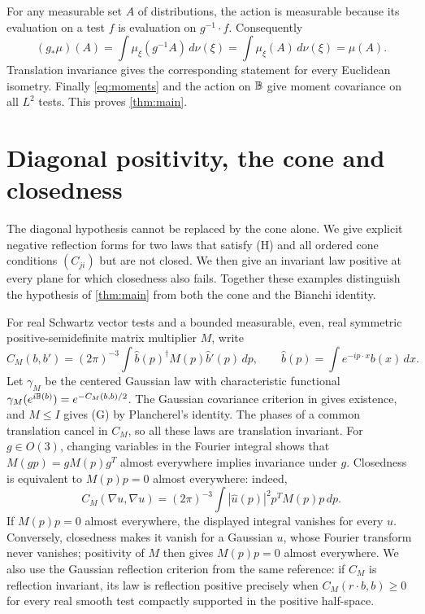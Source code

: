 \documentclass[11pt,letterpaper,reqno]{amsart}
\theoremstyle{definition}
\theoremstyle{remark}
\begin{document}
For any measurable set $A$ of distributions, the action is measurable
because its evaluation on a test $f$ is evaluation on $g^{-1}\cdot f$.
Consequently
\[
 (g_*\mu)(A)=\int\mu_\xi(g^{-1}A)\,d\nu(\xi)
            =\int\mu_\xi(A)\,d\nu(\xi)=\mu(A).
\]
Translation invariance gives the corresponding statement for every
Euclidean isometry. Finally \eqref{eq:moments} and the action on
$\mathbb B$ give moment covariance on all $L^2$ tests. This proves
\cref{thm:main}.

\section{Diagonal positivity, the cone and closedness}\label{sec:examples}

The diagonal hypothesis cannot be replaced by the cone alone. We give
explicit negative reflection forms for two laws that satisfy (H) and
all ordered cone conditions $(C_{ji})$ but are not closed. We then
give an invariant law positive at every plane for which closedness
also fails. Together these examples distinguish the hypothesis of
\cref{thm:main} from both the cone and the Bianchi identity.

For real Schwartz vector tests and a bounded measurable, even, real
symmetric positive-semidefinite matrix multiplier $M$, write
\[
 C_M(b,b')=(2\pi)^{-3}\int\widehat b(p)^\dagger M(p)\widehat b'(p)\,dp,
 \qquad \widehat b(p)=\int e^{-ip\cdot x}b(x)\,dx.
\]
Let $\gamma_M$ be the centered Gaussian law with characteristic
functional $\gamma_M(e^{i\mathbb B(b)})=e^{-C_M(b,b)/2}$.
The Gaussian covariance criterion in
\cite[Appendix~D, ``Gaussian laws and reflection positivity'']{QEDConsequences}
gives existence, and $M\le I$ gives (G) by Plancherel's identity.
The phases of a common translation cancel in $C_M$, so all these
laws are translation invariant. For $g\in O(3)$, changing variables in
the Fourier integral shows that $M(gp)=gM(p)g^T$ almost everywhere implies
invariance under $g$. Closedness is equivalent to
$M(p)p=0$ almost everywhere: indeed,
\[
 C_M(\nabla u,\nabla u)
 =(2\pi)^{-3}\int|\widehat u(p)|^2p^TM(p)p\,dp.
\]
If $M(p)p=0$ almost everywhere, the displayed integral vanishes for
every $u$. Conversely, closedness makes it vanish for a Gaussian
$u$, whose Fourier transform never vanishes; positivity of $M$ then
gives $M(p)p=0$ almost everywhere.
We also use the Gaussian reflection criterion from the same reference:
if $C_M$ is reflection invariant, its law is reflection positive
precisely when $C_M(r\cdot b,b)\ge0$ for every real smooth test
compactly supported in the positive half-space.
\end{document}
